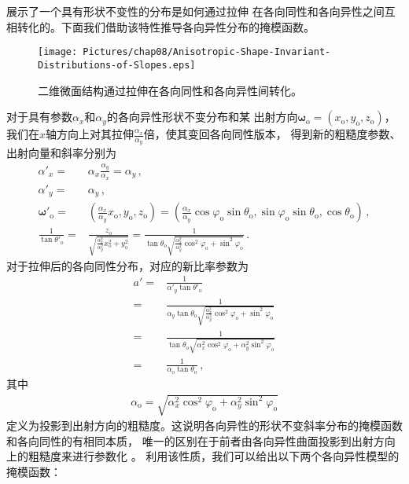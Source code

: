展示了一个具有形状不变性的分布是如何通过拉伸
在各向同性和各向异性之间互相转化的。下面我们借助该特性推导各向异性分布的掩模函数。
\begin{figure}[htbp]
    \centering
    \texttt{[image: Pictures/chap08/Anisotropic-Shape-Invariant-Distributions-of-Slopes.eps]}
    \caption{二维微面结构通过拉伸在各向同性和各向异性间转化。}
    \label{fig:08ex01-2D-Anisotropic-Stretch}
\end{figure}

对于具有参数$\alpha_x$和$\alpha_y$的各向异性形状不变分布和某
出射方向${\bm\omega}_{\mathrm{o}}=(x_{\mathrm{o}},y_{\mathrm{o}},z_{\mathrm{o}})$，
我们在$x$轴方向上对其拉伸$\displaystyle\frac{\alpha_x}{\alpha_y}$倍，使其变回各向同性版本，
得到新的粗糙度参数、出射向量和斜率分别为
\begin{align}
    \alpha'_x=&\alpha_x\frac{\alpha_y}{\alpha_x}=\alpha_y\, ,\\
    \alpha'_y=&\alpha_y\, ,\\
    {\bm\omega}'_{\mathrm{o}}=&(\frac{\alpha_x}{\alpha_y}x_{\mathrm{o}},y_{\mathrm{o}},z_{\mathrm{o}})
    =(\frac{\alpha_x}{\alpha_y}\cos\varphi_{\mathrm{o}}\sin\theta_{\mathrm{o}},
    \sin\varphi_{\mathrm{o}}\sin\theta_{\mathrm{o}},\cos\theta_{\mathrm{o}})\, ,\\
    \frac{1}{\tan\theta'_{\mathrm{o}}}=&\frac{z_{\mathrm{o}}}
    {\sqrt{\displaystyle\frac{\alpha_x^2}{\alpha_y^2}x_{\mathrm{o}}^2+y_{\mathrm{o}}^2}}
    =\frac{1}{\tan\theta_{\mathrm{o}}\sqrt{\displaystyle\frac{\alpha_x^2}{\alpha_y^2}\cos^2\varphi_{\mathrm{o}}+\sin^2\varphi_{\mathrm{o}}}}\, .
\end{align}
对于拉伸后的各向同性分布，对应的新比率参数为
\begin{align}
    a'=&\frac{1}{\alpha'_y\tan\theta'_{\mathrm{o}}}\nonumber\\
      =&\frac{1}{\alpha_y\tan\theta_{\mathrm{o}}\sqrt{\displaystyle\frac{\alpha_x^2}{\alpha_y^2}\cos^2\varphi_{\mathrm{o}}+\sin^2\varphi_{\mathrm{o}}}}\nonumber\\
      =&\frac{1}{\tan\theta_{\mathrm{o}}\sqrt{\alpha_x^2\cos^2\varphi_{\mathrm{o}}+\alpha_y^2\sin^2\varphi_{\mathrm{o}}}}\nonumber\\
      =&\frac{1}{\alpha_{\mathrm{o}}\tan\theta_{\mathrm{o}}}\, ,
\end{align}
其中
\begin{align}
    \alpha_{\mathrm{o}}=\sqrt{\alpha_x^2\cos^2\varphi_{\mathrm{o}}+\alpha_y^2\sin^2\varphi_{\mathrm{o}}}
\end{align}
定义为投影到出射方向的粗糙度。这说明各向异性的形状不变斜率分布的掩模函数和各向同性的有相同本质，
唯一的区别在于前者由各向异性曲面投影到出射方向上的粗糙度来进行参数化
。
利用该性质，我们可以给出以下两个各向异性模型的掩模函数：

